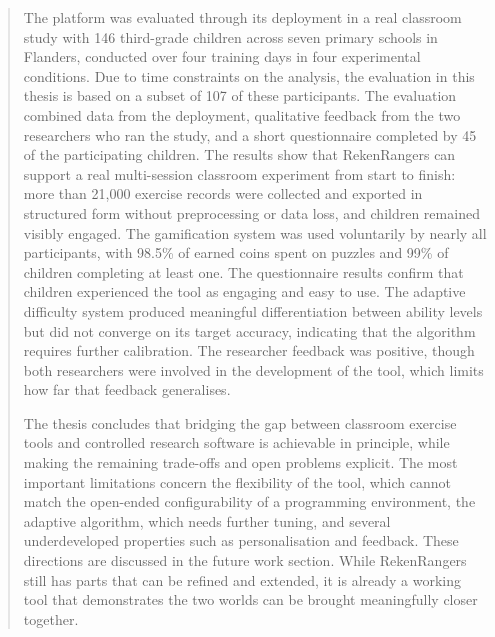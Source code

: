 \documentclass[master=ecws,english]{kulemt}
\begin{document}
\begin{abstract}
The platform was evaluated through its deployment in a real classroom study with 146 third-grade children across seven primary schools in Flanders, conducted over four training days in four experimental conditions. Due to time constraints on the analysis, the evaluation in this thesis is based on a subset of 107 of these participants. The evaluation combined data from the deployment, qualitative feedback from the two researchers who ran the study, and a short questionnaire completed by 45 of the participating children. The results show that RekenRangers can support a real multi-session classroom experiment from start to finish: more than 21,000 exercise records were collected and exported in structured form without preprocessing or data loss, and children remained visibly engaged. The gamification system was used voluntarily by nearly all participants, with 98.5\% of earned coins spent on puzzles and 99\% of children completing at least one. The questionnaire results confirm that children experienced the tool as engaging and easy to use. The adaptive difficulty system produced meaningful differentiation between ability levels but did not converge on its target accuracy, indicating that the algorithm requires further calibration. The researcher feedback was positive, though both researchers were involved in the development of the tool, which limits how far that feedback generalises.

The thesis concludes that bridging the gap between classroom exercise tools and controlled research software is achievable in principle, while making the remaining trade-offs and open problems explicit. The most important limitations concern the flexibility of the tool, which cannot match the open-ended configurability of a programming environment, the adaptive algorithm, which needs further tuning, and several underdeveloped properties such as personalisation and feedback. These directions are discussed in the future work section. While RekenRangers still has parts that can be refined and extended, it is already a working tool that demonstrates the two worlds can be brought meaningfully closer together.
\end{abstract}




\mainmatter















\appendix







\end{document}
